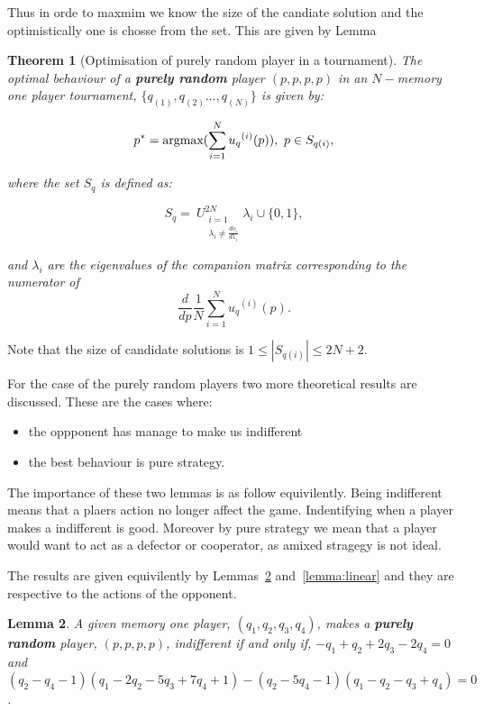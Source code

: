 \documentclass[10pt]{article}
\newtheorem{theorem}{Theorem}
\newtheorem{lemma}[theorem]{Lemma}
\begin{document}
Thus in orde to maxmim we know the size of the candiate solution and the optimistically
one is chosse from the set. This are given by Lemma

\begin{theorem}[Optimisation of purely random player in a tournament]
    \label{theorem:mo_optimisation_tournament}
    The optimal behaviour of a \textbf{purely random} player \((p, p, p, p)\)
    in an \(N-\)memory one player tournament, \(\{q_{(1)}, q_{(2)} \dots,q_{(N)} \}
    \) is given by:
    
    \[p^* = \textnormal{argmax}(\sum_{i=1} ^ {N} {u_q}^{(i)} (p) ), \ p \in S_{q(i)},\]
    
    where the set \(S_{q}\) is defined as:
    
    \[S_{q} = \
    U_{\substack{i=1 \\ \lambda_i \neq \frac{do_i}{d1_i}}} ^ {2N}  \lambda_i \cup \{0, 1\},\]
    
    and \(\lambda_i\) are the eigenvalues of the companion matrix corresponding to the numerator of \[\frac{d}{dp} \frac{1}{N} \sum_{i=1} ^ {N} {u_q}^{(i)} (p).\]
    \end{theorem}
    
    Note that the size of candidate solutions is \( 1 \leq|S_{q(i)}| \leq 2N + 2\).


For the case of the purely random players two more theoretical results are discussed.
These are the cases where:

\begin{itemize}
    \item the oppponent has manage to make us indifferent
    \item the best behaviour is pure strategy.
\end{itemize}

The importance of these two lemmas is as follow equivilently. Being indifferent
means that a plaers action no longer affect the game. Indentifying when a player
makes a indifferent is good. Moreover by pure strategy we mean that a player
would want to act as a defector or cooperator, as amixed stragegy is not ideal.

The results are given equivilently by Lemmas~\ref{lemma:constant} and~\ref{lemma:linear}
and they are respective to the actions of the opponent.

\begin{lemma}\label{lemma:constant}
    A given memory one player, \((q_1, q_2, q_3, q_4)\), makes a \textbf{purely
    random} player, \((p, p, p, p)\), indifferent if and only if, 
    \(-q_1 + q_2 + 2q_3 - 2q_4 = 0 \) and 
    \((q_2 - q_4 - 1)(q_1 - 2q_2 - 5q_3 + 7q_4 + 1) -(q_2 - 5q_4 - 1)(q_1 - q_2 - q_3 + q_4) = 0 \).
\end{lemma}
\end{document}
